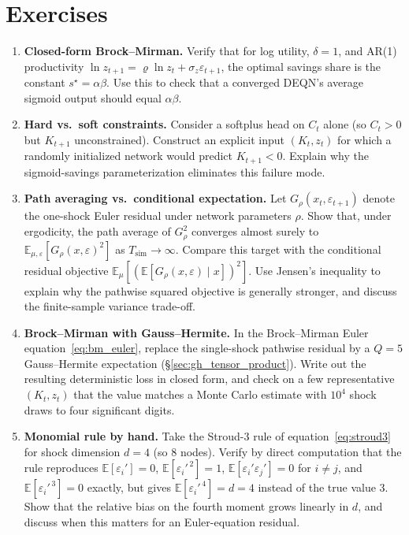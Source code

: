 \documentclass[11pt,a4paper]{report}
\newcommand{\E}[1]{\mathbb{E}\!\left[#1\right]}
\begin{document}
\section*{Exercises}
\begin{enumerate}[itemsep=4pt, leftmargin=*]
\item\label{ex:ch2:1} \textbf{Closed-form Brock--Mirman.}  Verify that for log utility, $\delta = 1$, and AR(1) productivity $\ln z_{t+1} = \varrho \ln z_t + \sigma_z \varepsilon_{t+1}$, the optimal savings share is the constant $s^\star = \alpha\beta$.  Use this to check that a converged DEQN's average sigmoid output should equal $\alpha\beta$.
\item\label{ex:ch2:2} \textbf{Hard vs.\ soft constraints.}  Consider a softplus head on $C_t$ alone (so $C_t > 0$ but $K_{t+1}$ unconstrained).  Construct an explicit input $(K_t, z_t)$ for which a randomly initialized network would predict $K_{t+1} < 0$.  Explain why the sigmoid-savings parameterization eliminates this failure mode.
\item\label{ex:ch2:3} \textbf{Path averaging vs.\ conditional expectation.}  Let $G_\rho(x_t,\varepsilon_{t+1})$ denote the one-shock Euler residual under network parameters $\rho$.  Show that, under ergodicity, the path average of $G_\rho^2$ converges almost surely to $\mathbb{E}_{\mu,\varepsilon}[G_\rho(x,\varepsilon)^2]$ as $T_{\text{sim}} \to \infty$.  Compare this target with the conditional residual objective $\mathbb{E}_{\mu}[(\mathbb{E}[G_\rho(x,\varepsilon)\mid x])^2]$.  Use Jensen's inequality to explain why the pathwise squared objective is generally stronger, and discuss the finite-sample variance trade-off.
\item\label{ex:ch2:4} \textbf{Brock--Mirman with Gauss--Hermite.}  In the Brock--Mirman Euler equation~\eqref{eq:bm_euler}, replace the single-shock pathwise residual by a $Q=5$ Gauss--Hermite expectation (\S\ref{sec:gh_tensor_product}).  Write out the resulting deterministic loss in closed form, and check on a few representative $(K_t, z_t)$ that the value matches a Monte Carlo estimate with $10^4$ shock draws to four significant digits.
\item\label{ex:ch2:5} \textbf{Monomial rule by hand.}  Take the Stroud-3 rule of equation~\eqref{eq:stroud3} for shock dimension $d=4$ (so $8$ nodes).  Verify by direct computation that the rule reproduces $\E{\varepsilon_i'}=0$, $\E{\varepsilon_i'^{\,2}}=1$, $\E{\varepsilon_i'\varepsilon_j'}=0$ for $i\neq j$, and $\E{\varepsilon_i'^{\,3}}=0$ exactly, but gives $\E{\varepsilon_i'^{\,4}} = d = 4$ instead of the true value $3$.  Show that the relative bias on the fourth moment grows linearly in $d$, and discuss when this matters for an Euler-equation residual.

\end{enumerate}
\end{document}
